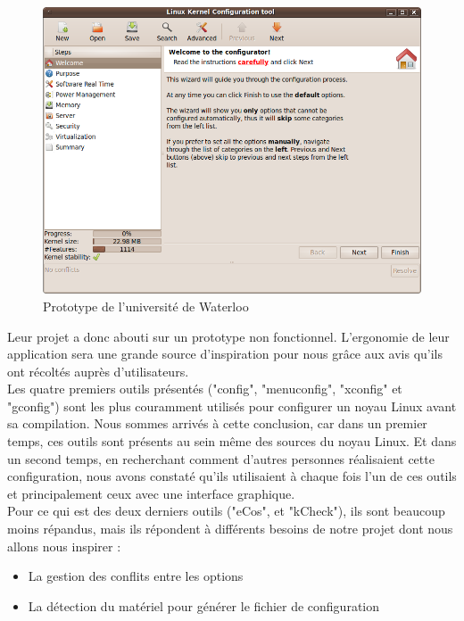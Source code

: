 \documentclass[16pts]{report}
\begin{document}
\begin{figure}[H]
    \includegraphics[scale=0.6]{illustrations/lkc_config.png}
    \centering
    \caption{Prototype de l'université de Waterloo}
    \label{fig:PrototypeWaterloo}
\end{figure}

Leur projet a donc abouti sur un prototype non fonctionnel.  L’ergonomie de
leur application sera une grande source d’inspiration pour nous grâce aux avis
qu’ils ont récoltés auprès d’utilisateurs.
\\

Les quatre premiers outils présentés ("config", "menuconfig", "xconfig" et
"gconfig") sont les plus couramment utilisés pour configurer un noyau Linux
avant sa compilation. Nous sommes arrivés à cette conclusion, car dans un
premier temps, ces outils sont présents au sein même des sources du noyau
Linux.  Et dans un second temps, en recherchant comment d'autres personnes
réalisaient cette configuration, nous avons constaté qu'ils utilisaient à
chaque fois l'un de ces outils et principalement ceux avec une interface
graphique.
\\

Pour ce qui est des deux derniers outils ("eCos", et "kCheck"), ils sont
beaucoup moins répandus, mais ils répondent à différents besoins de notre projet
dont nous allons nous inspirer :
\begin{itemize}
    \item La gestion des conflits entre les options
    \item La détection du matériel pour générer le fichier de configuration
\end{itemize}
\end{document}
